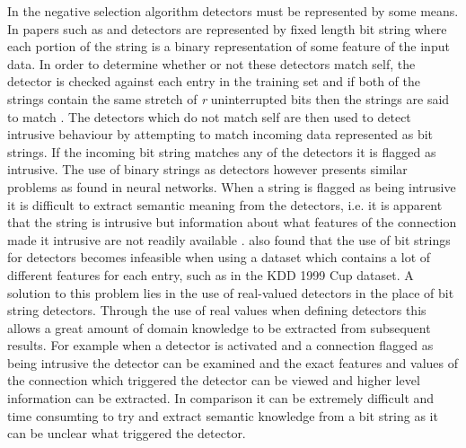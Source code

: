 	In the negative selection algorithm detectors must be represented by some means. In papers such as \cite{dasgupta1996novelty} and \cite{kim2001towards} detectors are represented by fixed length bit string where each portion of the string is a binary representation of some feature of the input data. In order to determine whether or not these detectors match self, the detector is checked against each entry in the training set and if both of the strings contain the same stretch of \textit{r} uninterrupted bits then the strings are said to match \cite{powers2008hybrid}. The detectors which do not match self are then used to detect intrusive behaviour by attempting to match incoming data represented as bit strings. If the incoming bit string matches any of the detectors it is flagged as intrusive. The use of binary strings as detectors however presents similar problems as found in neural networks. When a string is flagged as being intrusive it is difficult to extract semantic meaning from the detectors, i.e. it is apparent that the string is intrusive but information about what features of the connection made it intrusive are not readily available \cite{gonzalez2003anomaly}. \cite{kim2001evaluation} also found that the use of bit strings for detectors becomes infeasible when using a dataset which contains a lot of different features for each entry, such as in the KDD 1999 Cup dataset.
	A solution to this problem lies in the use of real-valued detectors in the place of bit string detectors. Through the use of real values when defining detectors this allows a great amount of domain knowledge to be extracted from subsequent results. For example when a detector is activated and a connection flagged as being intrusive the detector can be examined and the exact features and values of the connection which triggered the detector can be viewed and higher level information can be extracted. In comparison it can be extremely difficult and time consumting to try and extract semantic knowledge from a bit string as it can be unclear what triggered the detector.
